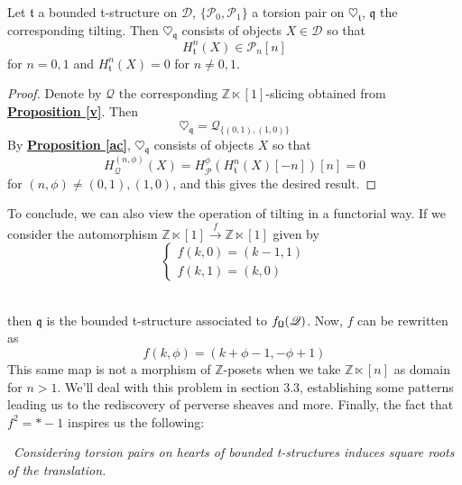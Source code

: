 \begin{prop}\label{tilt1}
Let $\mathfrak{t}$ a bounded t-structure on $\mathscr{D}$, $\{ \mathscr{P}_0, \mathscr{P}_1 \}$ a torsion pair on $\heartsuit_{\mathfrak{t}}$, $\mathfrak{q}$ the corresponding tilting. Then $\heartsuit_{\mathfrak{q}}$ consists of objects $X \in \mathscr{D}$ so that $$H^n_{\mathfrak{t}}(X) \in \mathscr{P}_n[n]$$
for $n=0,1$ and $H_{\mathfrak{t}}^n(X)=0$ for $n \not = 0,1$. 
\end{prop}

\begin{proof}
Denote by $\mathscr{Q}$ the corresponding $\mathbb{Z} \ltimes [1]$-slicing obtained from \hyperref[v]{\textbf{Proposition \ref*{v}}}. Then $$\heartsuit_{\mathfrak{q}}=\mathscr{Q}_{ \{ (0,1), (1,0) \} }$$ 
By \hyperref[ac]{\textbf{Proposition \ref*{ac}}}, $\heartsuit_{\mathfrak{q}}$ consists of objects $X$ so that $$H_{\mathscr{Q}}^{(n,\phi)}(X)=H_{\mathscr{P}}^{\phi}(H_{\mathfrak{t}}^n(X)[-n])[n]=0$$
for $(n,\phi) \not = (0,1),(1,0)$, and this gives the desired result.
\end{proof}

To conclude, we can also view the operation of tilting in a functorial way. If we consider the automorphism $\mathbb{Z} \ltimes [1] \overset{f}{\longrightarrow} \mathbb{Z} \ltimes [1]$ given by   $$\begin{cases} f(k,0)=(k-1,1) \\ f(k,1)=(k,0) \end{cases}$$
\begin{center}
\end{center}
\qquad \\
then $\mathfrak{q}$ is the bounded t-structure associated to $f_{\textnormal{\Libra}}(\mathscr{Q})$. Now, $f$ can be rewritten as 
$$f(k,\phi)=(k+\phi-1,-\phi +1)$$
This same map is not a morphism of $\mathbb{Z}$-posets when we take $\mathbb{Z} \ltimes [n]$ as domain for $n>1$. We'll deal with this problem in section $3.3$, establishing some patterns leading us to the rediscovery of perverse sheaves and more. Finally, the fact that  $f^2=*-1$ inspires us the following:  
\begin{center} 
\twonotes \ \textit{Considering torsion pairs on hearts of bounded t-structures induces square roots of the translation.}
\end{center}

